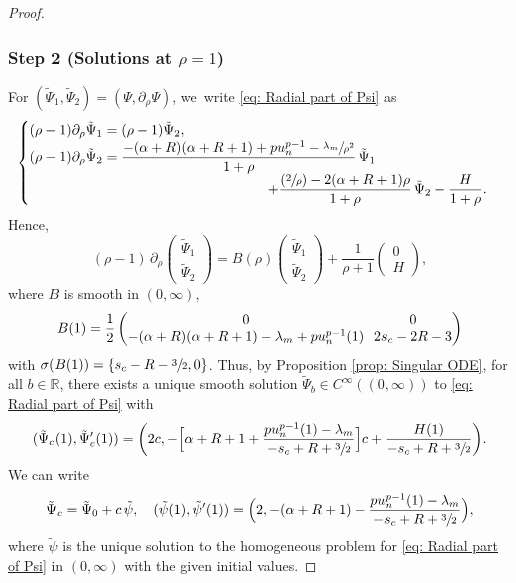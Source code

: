 \documentclass[JEP,XML,SOM,Unicode]{cedram}
\newcommand{\Psfrac}[2]{(\sfrac{#1}{#2})}
\theoremstyle{plain}
\theoremstyle{definition}
\begin{document}
\begin{proof}
\subsubsection*{Step 2 (Solutions at $\rho=1$)}
For $(\tilde \Psi_1,\tilde \Psi_2)=(\Psi,\partial_\rho\Psi)$, we~write \eqref{eq: Radial part of Psi} as
\[
\begin{cases}
(\rho-1)\partial_\rho \tilde \Psi_1=(\rho-1)\tilde \Psi_2,\\
(\rho-1)\partial_\rho \tilde \Psi_2=\dfrac{-(\alpha+R)(\alpha+R+1)+p u_n^{p-1}-\sfrac{\lambda_m}{\rho^2}}{1+\rho}\,\tilde \Psi_1\\
\hspace*{6cm}+\dfrac{\Psfrac{2}{\rho}-2(\alpha+R+1)\rho}{1+\rho}\,\tilde \Psi_2-\dfrac{H}{1+\rho}.
\end{cases}
\]
Hence,
\[
(\rho-1)\,\partial_\rho\begin{pmatrix}
\tilde\Psi_1\\
\tilde\Psi_2
\end{pmatrix}
= B(\rho)\begin{pmatrix}
\tilde\Psi_1\\
\tilde\Psi_2
\end{pmatrix}
+\frac{1}{\rho+1}\begin{pmatrix}
0\\
H
\end{pmatrix},
\]
where $B$ is smooth in $(0,\infty)$,
\[\arraycolsep3.5pt
B(1)=\frac{1}{2}\begin{pmatrix}
0 & 0\\
-(\alpha+R)(\alpha+R+1)-\lambda_m+pu_n^{p-1}(1) & 2s_c-2R-3\\
\end{pmatrix}
\]
with $\sigma(B(1))=\{s_c-R-\sfrac{3}{2},0\}$. Thus, by Proposition \ref{prop: Singular ODE}, for all $b\in\mathbb R$, there exists a unique smooth solution $\tilde \Psi_b\in C^\infty ((0,\infty))$ to \eqref{eq: Radial part of Psi} with
\[
(\tilde\Psi_c(1), \tilde\Psi_c'(1))=\bigg(2c,-\Big[\alpha+R+1+\frac{pu_n^{p-1}(1)-\lambda_m}{-s_c+R+\sfrac{3}{2}} \Big]c+\frac{H(1)}{-s_c+R+\sfrac{3}{2}}\bigg).
\]
We can write
\[
\tilde \Psi_c = \tilde \Psi_0+c\,\tilde\psi,\quad (\tilde\psi(1),\tilde\psi'(1))= \Big(2,-(\alpha+R+1)-\frac{pu_n^{p-1}(1)-\lambda_m}{-s_c+R+\sfrac{3}{2}} \Big),
\]
where $\tilde \psi$ is the unique solution to the homogeneous problem for \eqref{eq: Radial part of Psi} in $(0,\infty)$ with the given initial values.


\end{proof}
\end{document}
